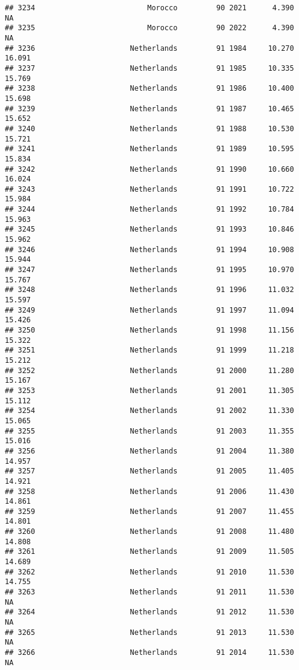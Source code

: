 \documentclass[
]{article}
\begin{document}
\begin{verbatim}
## 3234                          Morocco         90 2021      4.390         NA
## 3235                          Morocco         90 2022      4.390         NA
## 3236                      Netherlands         91 1984     10.270     16.091
## 3237                      Netherlands         91 1985     10.335     15.769
## 3238                      Netherlands         91 1986     10.400     15.698
## 3239                      Netherlands         91 1987     10.465     15.652
## 3240                      Netherlands         91 1988     10.530     15.721
## 3241                      Netherlands         91 1989     10.595     15.834
## 3242                      Netherlands         91 1990     10.660     16.024
## 3243                      Netherlands         91 1991     10.722     15.984
## 3244                      Netherlands         91 1992     10.784     15.963
## 3245                      Netherlands         91 1993     10.846     15.962
## 3246                      Netherlands         91 1994     10.908     15.944
## 3247                      Netherlands         91 1995     10.970     15.767
## 3248                      Netherlands         91 1996     11.032     15.597
## 3249                      Netherlands         91 1997     11.094     15.426
## 3250                      Netherlands         91 1998     11.156     15.322
## 3251                      Netherlands         91 1999     11.218     15.212
## 3252                      Netherlands         91 2000     11.280     15.167
## 3253                      Netherlands         91 2001     11.305     15.112
## 3254                      Netherlands         91 2002     11.330     15.065
## 3255                      Netherlands         91 2003     11.355     15.016
## 3256                      Netherlands         91 2004     11.380     14.957
## 3257                      Netherlands         91 2005     11.405     14.921
## 3258                      Netherlands         91 2006     11.430     14.861
## 3259                      Netherlands         91 2007     11.455     14.801
## 3260                      Netherlands         91 2008     11.480     14.808
## 3261                      Netherlands         91 2009     11.505     14.689
## 3262                      Netherlands         91 2010     11.530     14.755
## 3263                      Netherlands         91 2011     11.530         NA
## 3264                      Netherlands         91 2012     11.530         NA
## 3265                      Netherlands         91 2013     11.530         NA
## 3266                      Netherlands         91 2014     11.530         NA

\end{verbatim}
\end{document}
